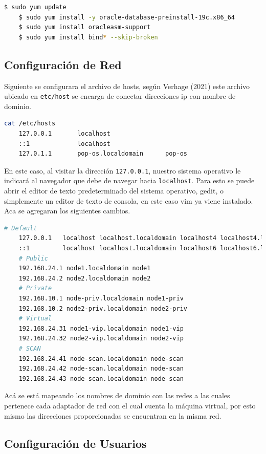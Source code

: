 \documentclass{article}
\begin{document}
\begin{lstlisting}[style=mystyle,language=bash]
	$ sudo yum update
	$ sudo yum install -y oracle-database-preinstall-19c.x86_64
	$ sudo yum install oracleasm-support
	$ sudo yum install bind* --skip-broken
\end{lstlisting}

\subsection{Configuración de Red}

Siguiente se configurara el archivo de hosts, según Verhage (2021) este archivo ubicado en \texttt{etc/host} se encarga de conectar direcciones ip con nombre de dominio.

\begin{lstlisting}[style=mystyle,language=bash]
	cat /etc/hosts
	127.0.0.1   	localhost
	::1         	localhost
	127.0.1.1   	pop-os.localdomain  	pop-os
\end{lstlisting}

En este caso, al visitar la dirección \texttt{127.0.0.1}, nuestro sistema operativo le indicará al navegador que debe de navegar hacia \texttt{localhost}. Para esto se puede abrir el editor de texto predeterminado del sistema operativo, gedit, o simplemente un editor de texto de consola, en este caso vim ya viene instalado. Aca se agregaran los siguientes cambios.

\begin{lstlisting}[style=mystyle,language=bash]
	# Default
	127.0.0.1   localhost localhost.localdomain localhost4 localhost4.localdomain4
	::1     	localhost localhost.localdomain localhost6 localhost6.localdomain6
	# Public
	192.168.24.1 node1.localdomain node1
	192.168.24.2 node2.localdomain node2
	# Private
	192.168.10.1 node-priv.localdomain node1-priv
	192.168.10.2 node2-priv.localdomain node2-priv
	# Virtual
	192.168.24.31 node1-vip.localdomain node1-vip
	192.168.24.32 node2-vip.localdomain node2-vip
	# SCAN
	192.168.24.41 node-scan.localdomain node-scan
	192.168.24.42 node-scan.localdomain node-scan
	192.168.24.43 node-scan.localdomain node-scan
\end{lstlisting}

Acá se está mapeando los nombres de dominio con las redes a las cuales pertenece cada adaptador de red con el cual cuenta la máquina virtual, por esto mismo las direcciones proporcionadas se encuentran en la misma red.

\subsection{Configuración de Usuarios}
\end{document}
